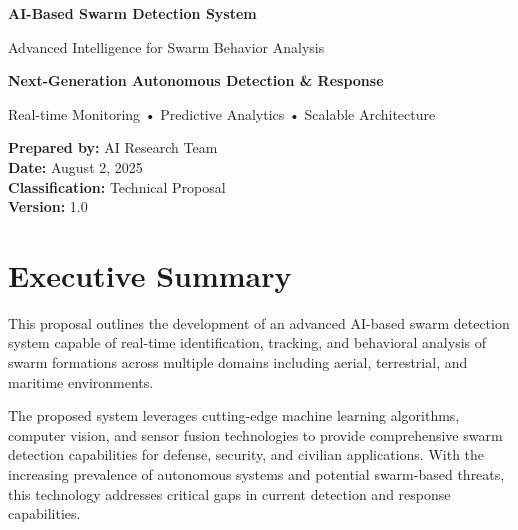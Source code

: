 \documentclass[11pt,a4paper]{article}
\begin{document}
\begin{titlepage}
    \centering
    \vspace*{2cm}
    
    {\Huge\bfseries\color{primary} AI-Based Swarm Detection System}
    
    \vspace{1cm}
    {\Large\color{secondary} Advanced Intelligence for Swarm Behavior Analysis}
    
    \vspace{2cm}
    
    \begin{tcolorbox}[colback=accent!15, colframe=accent, width=0.85\textwidth, arc=5mm]
        \centering
        \large\textbf{Next-Generation Autonomous Detection \& Response}
        
        \vspace{0.5cm}
        Real-time Monitoring • Predictive Analytics • Scalable Architecture
    \end{tcolorbox}
    
    \vfill
    
    {\large
    \textbf{Prepared by:} AI Research Team\\
    \textbf{Date:} August 2, 2025\\
    \textbf{Classification:} Technical Proposal\\
    \textbf{Version:} 1.0
    }
    
\end{titlepage}

\tableofcontents
\newpage

\section{Executive Summary}

\begin{highlight}
This proposal outlines the development of an advanced AI-based swarm detection system capable of real-time identification, tracking, and behavioral analysis of swarm formations across multiple domains including aerial, terrestrial, and maritime environments.
\end{highlight}

The proposed system leverages cutting-edge machine learning algorithms, computer vision, and sensor fusion technologies to provide comprehensive swarm detection capabilities for defense, security, and civilian applications. With the increasing prevalence of autonomous systems and potential swarm-based threats, this technology addresses critical gaps in current detection and response capabilities.
\end{document}
